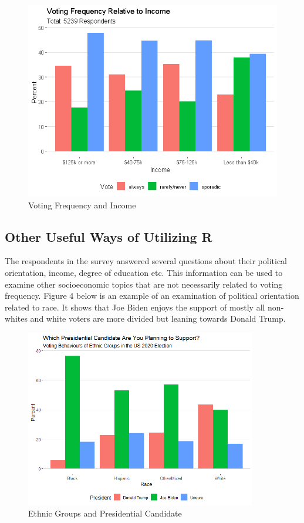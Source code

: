 \documentclass{article}
\begin{document}
\begin{figure}[!ht]
  \centering
  \includegraphics[width=\textwidth]{vote_income.png}
  \caption{Voting Frequency and Income}
\end{figure}
\pagebreak

\subsection{Other Useful Ways of Utilizing R}
The respondents in the survey answered several questions about their political orientation, income, degree of education etc. This information can be used to examine other socioeconomic topics that are not necessarily related to voting frequency.  Figure 4 below is an example of an examination of political orientation related to race. It shows that Joe Biden enjoys the support of mostly all non-whites and white voters are more divided but leaning towards Donald Trump.

\begin{figure}[!ht]
  \centering
  \includegraphics[width=0.9\textwidth]{race_president.png}
  \caption{Ethnic Groups and Presidential Candidate}
\end{figure}
\pagebreak
\end{document}

